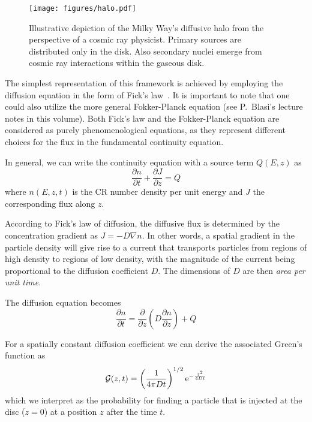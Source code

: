 \begin{figure}[t]
\centering
\texttt{[image: figures/halo.pdf]}
\caption{Illustrative depiction of the Milky Way's diffusive halo from the perspective of a cosmic ray physicist. Primary sources are distributed only in the disk. Also secondary nuclei emerge from cosmic ray interactions within the gaseous disk.}
\label{fig:galaxy}
\end{figure}

The simplest representation of this framework is achieved by employing the diffusion equation in the form of Fick's law~\cite{Fick1855}. 
%
It is important to note that one could also utilize the more general Fokker-Planck equation (see P.~Blasi's lecture notes in this volume). 
%
Both Fick's law and the Fokker-Planck equation are considered as purely phenomenological equations, as they represent different choices for the flux in the fundamental continuity equation.

In general, we can write the continuity equation with a source term $Q(E, z)$ as
%
\begin{equation}
\frac{\partial n}{\partial t} + \frac{\partial J}{\partial z} = Q
\end{equation}
%
where $n(E, z, t)$ is the CR number density per unit energy and $J$ the corresponding flux along $z$.

According to Fick's law of diffusion, the diffusive flux is determined by the concentration gradient as $J = -D \nabla n$. In other words, a spatial gradient in the particle density will give rise to a current that transports particles from regions of high density to regions of low density, with the magnitude of the current being proportional to the diffusion coefficient $D$. The dimensions of $D$ are then \emph{area per unit time}.

The diffusion equation becomes
%
\begin{equation}
\frac{\partial n}{\partial t} = \frac{\partial}{\partial z} \left( D\frac{\partial n}{\partial z} \right) + Q
\end{equation}

For a spatially constant diffusion coefficient we can derive the associated Green’s function as 
%
\begin{equation}
\mathcal G(z,t) = \left(\frac{1}{{4 \pi D t}}\right)^{1/2} {\rm e}^{-\frac{z^2}{4Dt}}
\label{eq:green}
\end{equation}
%
which we interpret as the probability for finding a particle that is injected at the disc ($z = 0$) at a position $z$ after the time $t$.

